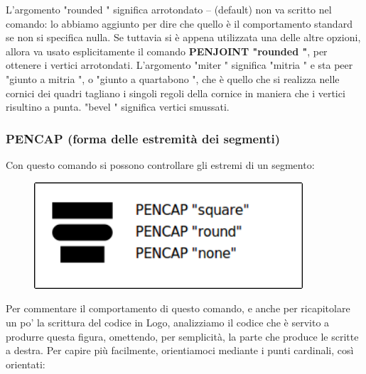 \vskip 1cm

L'argomento  "rounded " significa arrotondato – (default) non va scritto nel comando: lo abbiamo aggiunto per dire che quello è il comportamento standard se non si specifica nulla. Se tuttavia si è appena utilizzata una delle altre opzioni, allora va usato esplicitamente il comando \textbf{PENJOINT  "rounded "}, per ottenere i vertici arrotondati. L'argomento  "miter " significa  "mitria " e sta peer  "giunto a mitria ", o  "giunto a quartabono ", che è quello che si realizza nelle cornici dei quadri tagliano i singoli regoli della cornice in maniera che i vertici risultino a punta.  "bevel " significa vertici smussati.

\subsubsection{PENCAP (forma delle estremità dei segmenti)}

Con questo comando si possono controllare gli estremi di un segmento:

\vskip 1cm

\begin{figure}[H]
   \centering
   \includegraphics[width=10.0cm,trim=8 8 8 8,clip]{./images/disegnare/disegnare-36.png}
   \label{dis-36}
\end{figure}

\vskip 1cm

Per commentare il comportamento di questo comando, e anche per ricapitolare un po' la scrittura del codice in Logo, analizziamo il codice che è servito a produrre questa figura, omettendo, per semplicità, la parte che produce le scritte a destra. Per capire più facilmente, orientiamoci mediante i punti cardinali, così orientati:

\vskip 1cm

